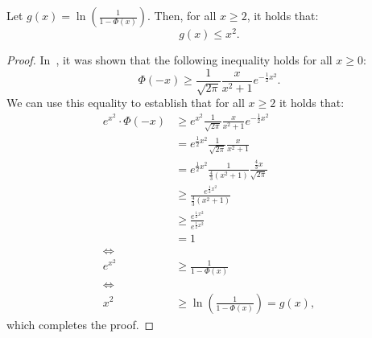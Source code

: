 \begin{lemma}
    \label{lemma:upper-bound}
    Let $g(x) = \ln \left(\frac{1}{1 - \Phi(x)}\right)$.
    Then, for all $x \geq 2$, it holds that:
    \begin{equation*}
        g(x) \leq x^2.
    \end{equation*}
\end{lemma}
\begin{proof}
    In~\cite{gaussian_bounds}, it was shown that the following inequality
    holds for all $x \geq 0$:
    \begin{equation*}
        \Phi(-x) \geq \frac{1}{\sqrt{2 \pi}} \frac{x}{x^2 + 1} e^{-\frac{1}{2} x^2}.
    \end{equation*}
    We can use this equality to establish that for all
    $x \geq 2$ it holds that:
    \begin{align*}
        e^{x^2} \cdot \Phi(-x) & \geq e^{x^2} \frac{1}{\sqrt{2 \pi}} \frac{x}{x^2 + 1} e^{-\frac{1}{2} x^2}                           \\
                               & = e^{\frac{1}{2} x^2} \frac{1}{\sqrt{2 \pi}} \frac{x}{x^2 + 1}                                       \\
                               & = e^{\frac{1}{2} x^2} \frac{1}{\frac{4}{3}\left( x^2 + 1 \right)} \frac{\frac{4}{3} x}{\sqrt{2 \pi}} \\
                               & \geq \frac{e^{\frac{1}{2} x^2}}{\frac{4}{3}\left( x^2 + 1 \right)}                                   \\
                               & \geq \frac{e^{\frac{1}{2} x^2}}{e^{\frac{1}{2} x^2}}                                                 \\
                               & = 1                                                                                                  \\
        \iff                                                                                                                          \\
        e^{x^2}                & \geq \frac{1}{1 - \Phi(x)}                                                                           \\
        \iff                                                                                                                          \\
        x^2                    & \geq \ln \left(\frac{1}{1 - \Phi(x)}\right) = g(x),
    \end{align*}
    which completes the proof.
\end{proof}


